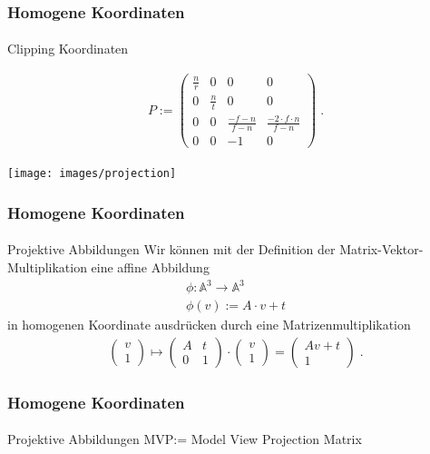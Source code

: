 \documentclass{beamer}
\begin{document}
\begin{frame}
    \frametitle{Homogene Koordinaten}
\framesubtitle{}
\begin{block}{Clipping Koordinaten}

\begin{align*}
P := \begin{pmatrix}  
\frac{n}{r}  &  0 & 0  & 0  \\
0   &  \frac{n}{t} & 0 & 0  \\
0   &  0 & \frac{-f-n}{f-n} & \frac{-2\cdot f \cdot n}{f-n}  \\
0   &  0 & -1 & 0  
\end{pmatrix}  \; .
\end{align*} 



\end{block}
\begin{center}
\texttt{[image: images/projection]}
\end{center}
\end{frame}


\begin{frame}
    \frametitle{Homogene Koordinaten}
\framesubtitle{}
\begin{block}{Projektive Abbildungen}
Wir können mit der Definition der Matrix-Vektor-Multiplikation eine affine Abbildung 
\begin{align*}
\phi : \mathbb{A}^{3} \to \mathbb{A}^{3} \\
\phi(v):=  A \cdot v + t
\end{align*}
in homogenen Koordinate ausdrücken durch eine Matrizenmultiplikation
\begin{align*}
\begin{pmatrix} v \\ 1\end{pmatrix} \mapsto \begin{pmatrix}  A  & t  \\ 0 &1\end{pmatrix} \cdot  \begin{pmatrix} v \\ 1\end{pmatrix}  =    \begin{pmatrix}  A v +t   \\ 1\end{pmatrix}  \; .
\end{align*}
\end{block}
\end{frame}


\begin{frame}
    \frametitle{Homogene Koordinaten}
\framesubtitle{}
\begin{block}{Projektive Abbildungen}
MVP:= Model View Projection Matrix
\end{block}
\end{frame}
\end{document}
